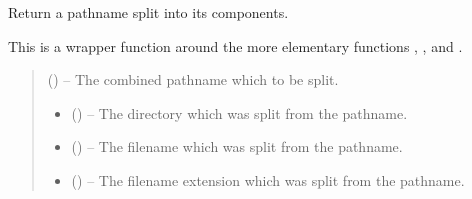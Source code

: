 \documentclass[letterpaper,11pt,english]{sphinxmanual}
\begin{document}

\begin{savenotes}\begin{fulllineitems}
\label{\detokenize{code/lezargus.library.path:lezargus.library.path.split_pathname}}
\pysigstartsignatures
{}
\pysigstopsignatures
\sphinxAtStartPar
Return a pathname split into its components.

\sphinxAtStartPar
This is a wrapper function around the more elementary functions
, , and
.
\begin{quote}\begin{description}
\sphinxAtStartPar
{} () – The combined pathname which to be split.

\sphinxAtStartPar
\begin{itemize}
\item {} 
\sphinxAtStartPar
{} () – The directory which was split from the pathname.

\item {} 
\sphinxAtStartPar
{} () – The filename which was split from the pathname.

\item {} 
\sphinxAtStartPar
{} () – The filename extension which was split from the pathname.

\end{itemize}


\end{description}\end{quote}

\end{fulllineitems}\end{savenotes}


\sphinxstepscope
\end{document}
